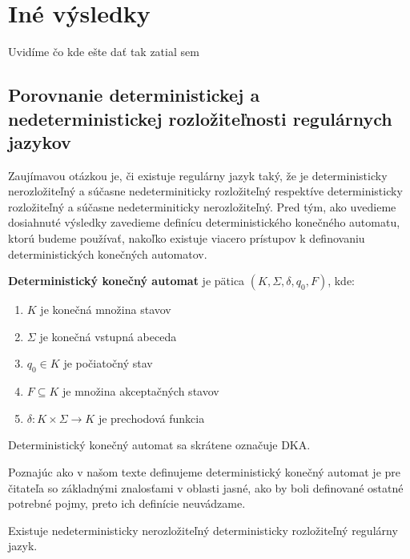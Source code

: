 \chapter[Iné výsledky]{Iné výsledky}
\label{kap:properties_of_classes}

Uvidíme čo kde ešte dať tak zatial sem

\section{Porovnanie deterministickej a nedeterministickej rozložiteľnosti regulárnych jazykov}

Zaujímavou otázkou je, či existuje regulárny jazyk taký, že je deterministicky nerozložiteľný a súčasne nedeterminiticky rozložiteľný respektíve deterministicky rozložiteľný a súčasne nedeterminiticky nerozložiteľný. Pred tým, ako uvedieme dosiahnuté výsledky zavedieme definícu deterministického konečného automatu, ktorú budeme používať, nakoľko existuje viacero prístupov k definovaniu deterministických konečných automatov.

\begin{definition}
\textbf{Deterministický konečný automat} je pätica $ (K, \Sigma, \delta, q_0, F) $, kde:
\begin{enumerate}  
\item $ K $ je konečná množina stavov
\item $ \Sigma $ je konečná vstupná abeceda
\item $ q_0 \in K $ je počiatočný stav
\item $ F \subseteq K $ je množina akceptačných stavov
\item $ \delta : K \times \Sigma \rightarrow K $ je prechodová funkcia
\end{enumerate}
\end{definition}

\begin{note}
Deterministický konečný automat sa skrátene označuje DKA.
\end{note}

Poznajúc ako v našom texte definujeme deterministický konečný automat je pre čitateľa so základnými znalosťami v oblasti jasné, ako by boli definované ostatné potrebné pojmy, preto ich definície neuvádzame.

\begin{theorem}
Existuje nedeterministicky nerozložiteľný deterministicky rozložiteľný regulárny jazyk.
\end{theorem}

